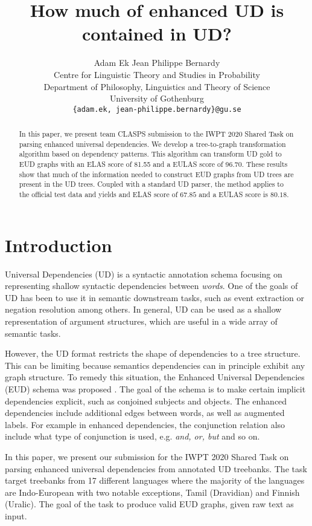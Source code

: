 \documentclass[11pt,a4paper]{article}
\title{How much of enhanced UD is contained in UD?}
\author{Adam Ek \qquad Jean Philippe Bernardy\\
    Centre for Linguistic Theory and Studies in Probability \\
    Department of Philosophy, Linguistics and Theory of Science \\
    University of Gothenburg \\
    \texttt{\{adam.ek, jean-philippe.bernardy\}@gu.se} \\}
\date{}
\begin{document}
\maketitle
    
\begin{abstract}
  In this paper, we present team CLASPS submission to the IWPT 2020
  Shared Task on parsing enhanced universal dependencies. We develop a
  tree-to-graph transformation algorithm based on dependency
  patterns. This algorithm can transform UD gold to EUD graphs with an
  ELAS score of 81.55 and a EULAS score of 96.70.  These results show
  that much of the information needed to construct EUD graphs from UD
  trees are present in the UD trees.
  Coupled with a standard UD parser, the method applies to the
  official test data and yields and ELAS score of $67.85$ and a EULAS
  score is $80.18$.
\end{abstract}

\section{Introduction}
Universal Dependencies (UD) is a syntactic annotation schema
focusing on representing shallow syntactic dependencies between
\emph{words}. One of the goals of UD has been to use it in
semantic downstream tasks, such as event extraction
\citep{fares20182018, mcclosky2011event} or negation resolution
\citep{fares20182018} among others. In general, UD can be used as
a shallow representation of argument structures, which are useful
in a wide array of semantic tasks.

However, the UD format restricts the shape of dependencies to a tree
structure.  This can be limiting because semantics dependencies can
in principle exhibit any graph structure.
To remedy this situation, the Enhanced Universal Dependencies
(EUD) schema was proposed \citep{schuster2016enhanced}. The goal
of the schema is to make certain implicit dependencies explicit,
such as conjoined subjects and objects. The enhanced dependencies
include additional edges between words, as well as augmented
labels. For example in enhanced dependencies, the conjunction
relation also include what type of conjunction is used, e.g.
\textit{and, or, but} and so on.

In this paper, we present our submission for the IWPT 2020 Shared
Task on parsing enhanced universal dependencies from annotated UD
treebanks. The task target treebanks from 17 different languages
where the majority of the languages are Indo-European with two
notable exceptions, Tamil (Dravidian) and Finnish (Uralic).  The
goal of the task to produce valid EUD graphs, given raw text as
input.
\end{document}
